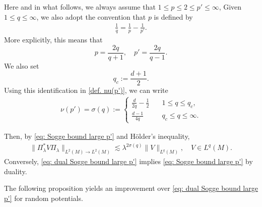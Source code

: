 \documentclass[12pt,reqno]{amsart}
\theoremstyle{definition}
\theoremstyle{remark}
\numberwithin{equation}{section}
\newcommand{\1}{\mathbbm{1}}
\begin{document}
Here and in what follows, we always assume that $1\leq p\leq 2\leq p'\leq \infty$, 
Given $1\leq q\leq\infty$, we also adopt the convention that $p$ is defined by
\begin{align}\label{eq:1/q=1/p-1/p'}
\frac{1}{q}=\frac{1}{p}-\frac{1}{p'}.
\end{align}
More explicitly, this means that
\[
p=\frac{2q}{q+1},\quad p'=\frac{2q}{q-1}.
\]
We also set
\[
q_c:=\frac{d+1}{2}.
\]
Using this identification in \eqref{def. nu(p')}, we can write 
\begin{align}\label{sigma(q)}
  \nu(p')=\sigma(q):=\begin{cases}
        \frac{d}{2q}-\frac{1}{2}\quad & 1\leq  q\leq q_c,\\
        \frac{d-1}{4q}\quad & q_c\leq q\leq\infty. 
    \end{cases}   
\end{align}


Then, by \eqref{eq: Sogge bound large p'} and H\"older's inequality,
\begin{align}\label{eq: dual Sogge bound large p'}
  \|\Pi_{\lambda} ^*V\Pi_{\lambda} \|_{L^2(M)\to L^2(M)}
  \lesssim \lambda^{2\sigma(q)}\|V\|_{L^q(M)},\quad V\in L^q(M).
\end{align}
Conversely, \eqref{eq: dual Sogge bound large p'} implies \eqref{eq: Sogge bound large p'} by duality.

The following proposition yields an improvement over \eqref{eq: dual Sogge bound large p'} for random potentials.  
\end{document}
